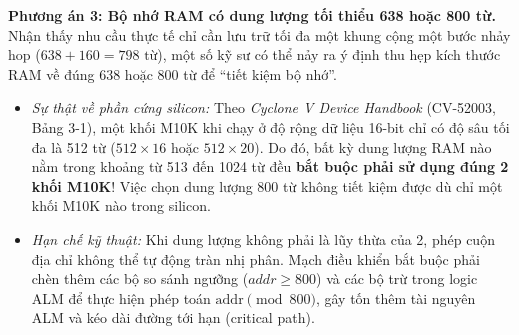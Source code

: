 \textbf{Phương án 3: Bộ nhớ RAM có dung lượng tối thiểu 638 hoặc 800 từ.}
Nhận thấy nhu cầu thực tế chỉ cần lưu trữ tối đa một khung cộng một bước nhảy hop ($638 + 160 = 798\text{ từ}$), một số kỹ sư có thể nảy ra ý định thu hẹp kích thước RAM về đúng 638 hoặc 800 từ để ``tiết kiệm bộ nhớ''.
\begin{itemize}[leftmargin=1.5em, itemsep=2pt]
    \item \emph{Sự thật về phần cứng silicon:} Theo \emph{Cyclone V Device Handbook} (CV-52003, Bảng 3-1), một khối M10K khi chạy ở độ rộng dữ liệu 16-bit chỉ có độ sâu tối đa là 512 từ ($512 \times 16$ hoặc $512 \times 20$). Do đó, bất kỳ dung lượng RAM nào nằm trong khoảng từ 513 đến 1024 từ đều \textbf{bắt buộc phải sử dụng đúng 2 khối M10K}! Việc chọn dung lượng 800 từ không tiết kiệm được dù chỉ một khối M10K nào trong silicon.
    \item \emph{Hạn chế kỹ thuật:} Khi dung lượng không phải là lũy thừa của 2, phép cuộn địa chỉ không thể tự động tràn nhị phân. Mạch điều khiển bắt buộc phải chèn thêm các bộ so sánh ngưỡng ($addr \ge 800$) và các bộ trừ trong logic ALM để thực hiện phép toán $\text{addr} \pmod{800}$, gây tốn thêm tài nguyên ALM và kéo dài đường tới hạn (critical path).
\end{itemize}

\begin{table}[t]
\centering
\caption{So sánh định lượng 3 phương án phần cứng cho bộ đệm chia khung ($N = 638, \text{hop} = 160$)}
\label{tab:ch04_buffer_options}
\end{table}

